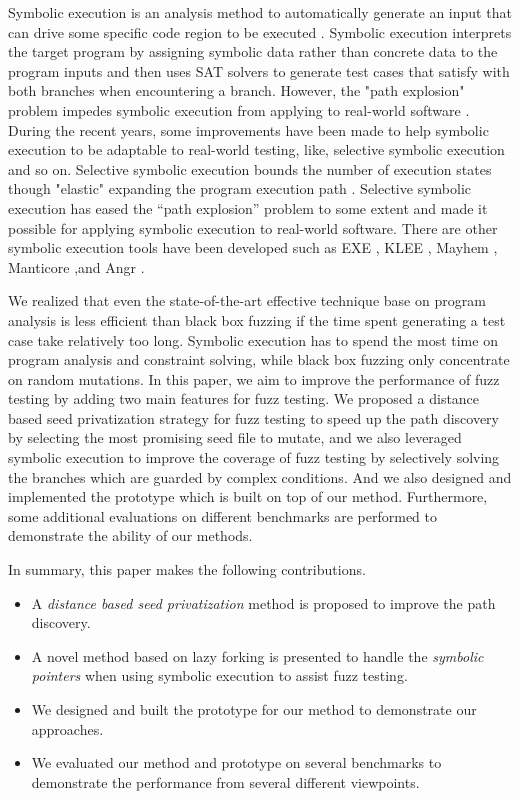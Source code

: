 Symbolic execution is an analysis method to automatically generate an input that can drive some specific code region to be executed \cite{King:Symbex}. Symbolic execution interprets the target program by assigning symbolic data rather than concrete data to the program inputs and then uses SAT solvers to generate test cases that satisfy with both branches when encountering a branch. However, the "path explosion" problem impedes symbolic execution from applying to real-world software \cite{Boonstoppel:RAP}. During the recent years, some improvements have been made to help symbolic execution to be adaptable to real-world testing, like, selective symbolic execution and so on. Selective symbolic execution bounds the number of execution states though "elastic" expanding the program execution path \cite{chipounov2009selective, chipounov2011s2e}. Selective symbolic execution has eased the ``path explosion'' problem to some extent and made it possible for applying symbolic execution to real-world software. There are other symbolic execution tools have been developed such as EXE \cite{cadar2006exe}, KLEE \cite{cadar2008klee}, Mayhem \cite{cha2012unleashing}, Manticore \cite{online:manticore},and Angr \cite{shoshitaishvili2016sok}. 

We realized that even the state-of-the-art effective technique base on program analysis is less efficient than black box fuzzing if the time spent generating a test case take relatively too long. Symbolic execution has to spend the most time on program analysis and constraint solving, while black box fuzzing only concentrate on random mutations. 
In this paper, we aim to improve the performance of fuzz testing by adding two main features for fuzz testing. We proposed a distance based seed privatization strategy for fuzz testing to speed up the path discovery by selecting the most promising seed file to mutate, and we also leveraged symbolic execution to improve the coverage of fuzz testing by selectively solving the branches which are guarded by complex conditions. And we also designed and implemented the prototype which is built on top of our method. Furthermore, some additional evaluations on different benchmarks are performed to demonstrate the ability of our methods.
 
In summary, this paper makes the following contributions.
\begin{itemize}
\item A \emph{distance based seed privatization} method is proposed to improve the path discovery.

\item A novel method based on lazy forking is presented to handle the \emph{symbolic pointers} when using symbolic execution to assist fuzz testing.

\item We designed and built the prototype for our method to demonstrate our approaches.

\item We evaluated our method and prototype on several benchmarks to demonstrate the performance from several different viewpoints.
\end{itemize}
